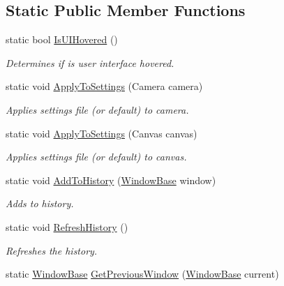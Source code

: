 \subsection*{Static Public Member Functions}
\begin{DoxyCompactItemize}
\item 
static bool \hyperlink{class_unity_engine_1_1_u_i_1_1_windows_1_1_window_system_a33fa13e31c24f13c8cf493d1eb1686f3}{Is\+U\+I\+Hovered} ()
\begin{DoxyCompactList}\small\item\em Determines if is user interface hovered. \end{DoxyCompactList}\item 
static void \hyperlink{class_unity_engine_1_1_u_i_1_1_windows_1_1_window_system_aacb38f1c58ec725b0e128124b98be463}{Apply\+To\+Settings} (Camera camera)
\begin{DoxyCompactList}\small\item\em Applies settings file (or default) to camera. \end{DoxyCompactList}\item 
static void \hyperlink{class_unity_engine_1_1_u_i_1_1_windows_1_1_window_system_a3f6f65144893a8bdd91233e96476357f}{Apply\+To\+Settings} (Canvas canvas)
\begin{DoxyCompactList}\small\item\em Applies settings file (or default) to canvas. \end{DoxyCompactList}\item 
static void \hyperlink{class_unity_engine_1_1_u_i_1_1_windows_1_1_window_system_a1c7fc4aee9e94334a9070d43f8dc609c}{Add\+To\+History} (\hyperlink{class_unity_engine_1_1_u_i_1_1_windows_1_1_window_base}{Window\+Base} window)
\begin{DoxyCompactList}\small\item\em Adds to history. \end{DoxyCompactList}\item 
static void \hyperlink{class_unity_engine_1_1_u_i_1_1_windows_1_1_window_system_a13de091a7b45fa0ca3e285576860203a}{Refresh\+History} ()
\begin{DoxyCompactList}\small\item\em Refreshes the history. \end{DoxyCompactList}\item 
static \hyperlink{class_unity_engine_1_1_u_i_1_1_windows_1_1_window_base}{Window\+Base} \hyperlink{class_unity_engine_1_1_u_i_1_1_windows_1_1_window_system_a69d9a23346d37a2343f14ef27ea0c46d}{Get\+Previous\+Window} (\hyperlink{class_unity_engine_1_1_u_i_1_1_windows_1_1_window_base}{Window\+Base} current)

\end{DoxyCompactItemize}
